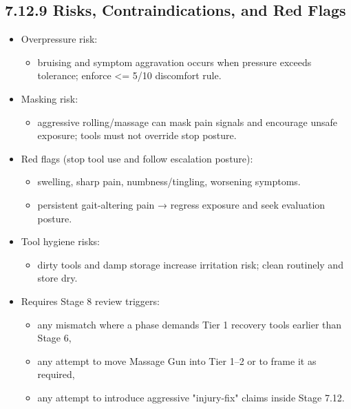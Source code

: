 \documentclass[10pt]{article}
\begin{document}
\subsection*{7.12.9 Risks, Contraindications, and Red Flags}
{}

\begin{itemize}
\item Overpressure risk:
  \begin{itemize}
  \item bruising and symptom aggravation occurs when pressure exceeds tolerance; enforce <= 5/10 discomfort rule.
  \end{itemize}
\item Masking risk:
  \begin{itemize}
  \item aggressive rolling/massage can mask pain signals and encourage unsafe exposure; tools must not override stop posture.
  \end{itemize}
\item Red flags (stop tool use and follow escalation posture):
  \begin{itemize}
  \item swelling, sharp pain, numbness/tingling, worsening symptoms.
  \item persistent gait-altering pain → regress exposure and seek evaluation posture.
  \end{itemize}
\item Tool hygiene risks:
  \begin{itemize}
  \item dirty tools and damp storage increase irritation risk; clean routinely and store dry.
  \end{itemize}
\item Requires Stage 8 review triggers:
  \begin{itemize}
  \item any mismatch where a phase demands Tier 1 recovery tools earlier than Stage 6,
  \item any attempt to move Massage Gun into Tier 1–2 or to frame it as required,
  \item any attempt to introduce aggressive "injury-fix" claims inside Stage 7.12.
  \end{itemize}
\end{itemize}
\end{document}
